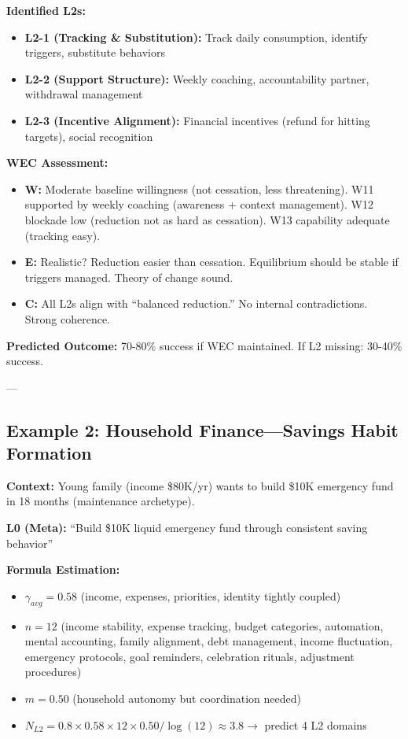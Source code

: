\documentclass[11pt, a4paper]{article}
\begin{document}
\textbf{Identified L2s:}
\begin{itemize}[nosep]
    \item \textbf{L2-1 (Tracking \& Substitution):} Track daily consumption, identify triggers, substitute behaviors
    \item \textbf{L2-2 (Support Structure):} Weekly coaching, accountability partner, withdrawal management
    \item \textbf{L2-3 (Incentive Alignment):} Financial incentives (refund for hitting targets), social recognition
\end{itemize}

\textbf{WEC Assessment:}
\begin{itemize}[nosep]
    \item \textbf{W:} Moderate baseline willingness (not cessation, less threatening). W11 supported by weekly coaching (awareness + context management). W12 blockade low (reduction not as hard as cessation). W13 capability adequate (tracking easy).
    \item \textbf{E:} Realistic? Reduction easier than cessation. Equilibrium should be stable if triggers managed. Theory of change sound.
    \item \textbf{C:} All L2s align with ``balanced reduction.'' No internal contradictions. Strong coherence.
\end{itemize}

\textbf{Predicted Outcome:} 70-80\% success if WEC maintained. If L2 missing: 30-40\% success.

---

\subsection{Example 2: Household Finance---Savings Habit Formation} \label{sec:ch15-part4c}

\textbf{Context:} Young family (income \$80K/yr) wants to build \$10K emergency fund in 18 months (maintenance archetype).

\textbf{L0 (Meta):} ``Build \$10K liquid emergency fund through consistent saving behavior''

\textbf{Formula Estimation:}
\begin{itemize}[nosep]
    \item $\gamma_{avg} = 0.58$ (income, expenses, priorities, identity tightly coupled)
    \item $n = 12$ (income stability, expense tracking, budget categories, automation, mental accounting, family alignment, debt management, income fluctuation, emergency protocols, goal reminders, celebration rituals, adjustment procedures)
    \item $m = 0.50$ (household autonomy but coordination needed)
    \item $N_{L2} = 0.8 \times 0.58 \times 12 \times 0.50 / \log(12) \approx 3.8 \rightarrow$ predict 4 L2 domains
\end{itemize}
\end{document}
